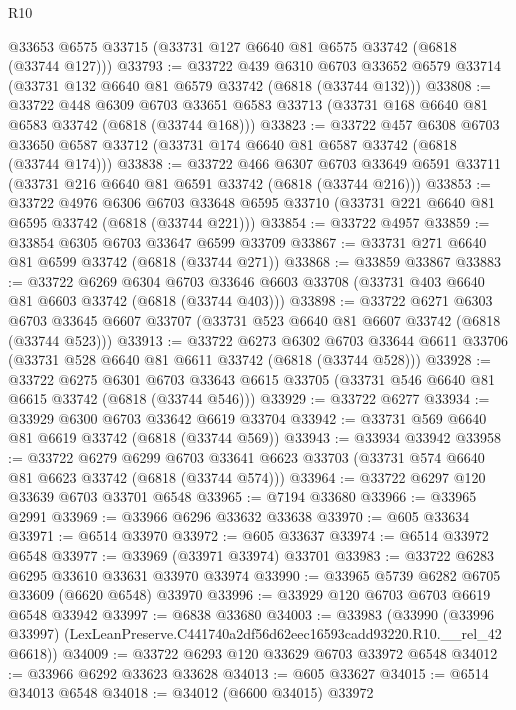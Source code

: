 \begin{lexlean}{R10}
\begin{coremodule}
    @33653
    @6575
    @33715
    (@33731 @127 @6640 @81 @6575 @33742 (@6818 (@33744 @127)))
@33793 := @33722
    @439
    @6310
    @6703
    @33652
    @6579
    @33714
    (@33731 @132 @6640 @81 @6579 @33742 (@6818 (@33744 @132)))
@33808 := @33722
    @448
    @6309
    @6703
    @33651
    @6583
    @33713
    (@33731 @168 @6640 @81 @6583 @33742 (@6818 (@33744 @168)))
@33823 := @33722
    @457
    @6308
    @6703
    @33650
    @6587
    @33712
    (@33731 @174 @6640 @81 @6587 @33742 (@6818 (@33744 @174)))
@33838 := @33722
    @466
    @6307
    @6703
    @33649
    @6591
    @33711
    (@33731 @216 @6640 @81 @6591 @33742 (@6818 (@33744 @216)))
@33853 := @33722
    @4976
    @6306
    @6703
    @33648
    @6595
    @33710
    (@33731 @221 @6640 @81 @6595 @33742 (@6818 (@33744 @221)))
@33854 := @33722 @4957
@33859 := @33854 @6305 @6703 @33647 @6599 @33709
@33867 := @33731 @271 @6640 @81 @6599 @33742 (@6818 (@33744 @271))
@33868 := @33859 @33867
@33883 := @33722
    @6269
    @6304
    @6703
    @33646
    @6603
    @33708
    (@33731 @403 @6640 @81 @6603 @33742 (@6818 (@33744 @403)))
@33898 := @33722
    @6271
    @6303
    @6703
    @33645
    @6607
    @33707
    (@33731 @523 @6640 @81 @6607 @33742 (@6818 (@33744 @523)))
@33913 := @33722
    @6273
    @6302
    @6703
    @33644
    @6611
    @33706
    (@33731 @528 @6640 @81 @6611 @33742 (@6818 (@33744 @528)))
@33928 := @33722
    @6275
    @6301
    @6703
    @33643
    @6615
    @33705
    (@33731 @546 @6640 @81 @6615 @33742 (@6818 (@33744 @546)))
@33929 := @33722 @6277
@33934 := @33929 @6300 @6703 @33642 @6619 @33704
@33942 := @33731 @569 @6640 @81 @6619 @33742 (@6818 (@33744 @569))
@33943 := @33934 @33942
@33958 := @33722
    @6279
    @6299
    @6703
    @33641
    @6623
    @33703
    (@33731 @574 @6640 @81 @6623 @33742 (@6818 (@33744 @574)))
@33964 := @33722 @6297 @120 @33639 @6703 @33701 @6548
@33965 := @7194 @33680
@33966 := @33965 @2991
@33969 := @33966 @6296 @33632 @33638
@33970 := @605 @33634
@33971 := @6514 @33970
@33972 := @605 @33637
@33974 := @6514 @33972 @6548
@33977 := @33969 (@33971 @33974) @33701
@33983 := @33722 @6283 @6295 @33610 @33631 @33970 @33974
@33990 := @33965 @5739 @6282 @6705 @33609 (@6620 @6548) @33970
@33996 := @33929 @120 @6703 @6703 @6619 @6548 @33942
@33997 := @6838 @33680
@34003 := @33983
    (@33990 (@33996 @33997) (LexLeanPreserve.C441740a2df56d62eec16593cadd93220.R10.__rel_42 @6618))
@34009 := @33722 @6293 @120 @33629 @6703 @33972 @6548
@34012 := @33966 @6292 @33623 @33628
@34013 := @605 @33627
@34015 := @6514 @34013 @6548
@34018 := @34012 (@6600 @34015) @33972

\end{coremodule}
\end{lexlean}

